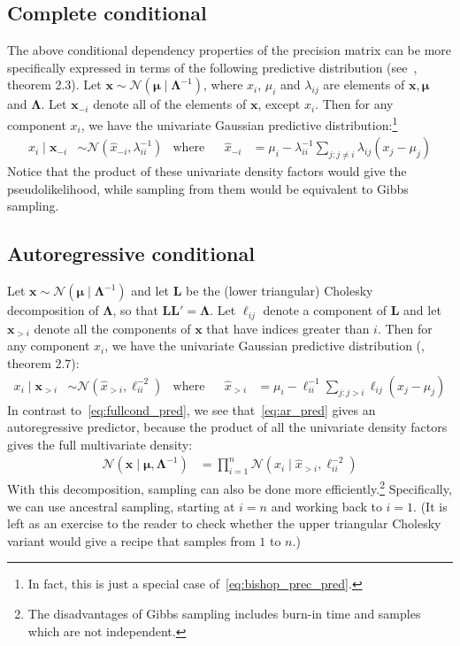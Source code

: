 \documentclass[a4paper,oneside,12pt,english]{report}
\def\Lambdamat{\boldsymbol{\Lambda}}
\def\ND{\mathcal{N}}
\def\Lmat{\mathbf{L}}
\def\xvec{\mathbf{x}}
\def\muvec{\boldsymbol{\mu}}
\begin{document}
\subsection{Complete conditional}
The above conditional dependency properties of the precision matrix can be more specifically expressed in terms of the following predictive distribution (see~\cite{GMRFbook}, theorem 2.3). Let $\xvec\sim\ND(\muvec\mid\Lambdamat^{-1})$, where $x_i$, $\mu_i$ and $\lambda_{ij}$ are elements of $\xvec,\muvec$ and $\Lambdamat$. Let $\xvec_{-i}$ denote all of the elements of $\xvec$, except $x_i$. Then for any component $x_i$, we have the univariate Gaussian predictive distribution:\footnote{In fact, this is just a special case of~\eqref{eq:bishop_prec_pred}.} 
\begin{align}
\label{eq:fullcond_pred}
x_i\mid\xvec_{-i}&\sim\ND(\hat x_{-i},\lambda^{-1}_{ii})& \text{where} &&
\hat x_{-i} &= \mu_i - \lambda_{ii}^{-1}\sum_{j:j\ne i} \lambda_{ij} (x_j-\mu_j)
\end{align}
Notice that the product of these univariate density factors would give the pseudolikelihood, while sampling from them would be equivalent to Gibbs sampling.

\subsection{Autoregressive conditional}
Let $\xvec\sim\ND(\muvec\mid\Lambdamat^{-1})$ and let $\Lmat$ be the (lower triangular) Cholesky decomposition of $\Lambdamat$, so that $\Lmat\Lmat'=\Lambdamat$. Let $\ell_{ij}$ denote a component of $\Lmat$ and let $\xvec_{>i}$ denote all the components of $\xvec$ that have indices greater than $i$. Then for any component $x_i$, we have the univariate Gaussian predictive distribution (\cite{GMRFbook}, theorem 2.7):
\begin{align}
\label{eq:ar_pred}
x_i\mid\xvec_{>i}&\sim\ND(\hat x_{>i},\ell^{-2}_{ii})& \text{where} &&
\hat x_{>i} &= \mu_i - \ell_{ii}^{-1}\sum_{j:j> i} \ell_{ij} (x_j-\mu_j)
\end{align}
In contrast to~\eqref{eq:fullcond_pred}, we see that~\eqref{eq:ar_pred} gives an autoregressive predictor, because the product of all the univariate density factors gives the full multivariate density:
\begin{align}
\ND(\xvec\mid\muvec,\Lambdamat^{-1}) &= \prod_{i=1}^n \ND(x_i \mid \hat x_{>i},\ell^{-2}_{ii})
\end{align} 
With this decomposition, sampling can also be done more efficiently.\footnote{The disadvantages of Gibbs sampling includes burn-in time and samples which are not independent.} Specifically, we can use ancestral sampling, starting at $i=n$ and working back to $i=1$. (It is left as an exercise to the reader to check whether the upper triangular Cholesky variant would give a recipe that samples from $1$ to $n$.)
\end{document}
